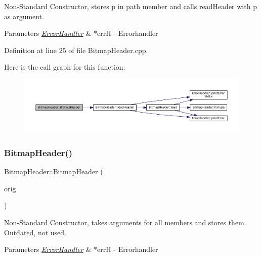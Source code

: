 Non-\/\+Standard Constructor, stores p in path member and calls read\+Header with p as argument. 


\begin{DoxyParams}{Parameters}
{\em \mbox{\hyperlink{classErrorHandler}{Error\+Handler}}} & $\ast$errH -\/ Errorhandler \\
\hline
\end{DoxyParams}


Definition at line 25 of file Bitmap\+Header.\+cpp.

Here is the call graph for this function\+:\nopagebreak
\begin{figure}[H]
\begin{center}
\leavevmode
\includegraphics[width=350pt]{classBitmapHeader_a2cf57f049eae7d2ee93d5749d678aca5_cgraph}
\end{center}
\end{figure}
\mbox{\label{classBitmapHeader_a25a5481f49d70a8c42a9efc17f17fd48}} 
\subsubsection{\texorpdfstring{BitmapHeader()}{BitmapHeader()}\hspace{0.1cm}{\footnotesize\ttfamily [3/3]}}
{\footnotesize\ttfamily Bitmap\+Header\+::\+Bitmap\+Header (\begin{DoxyParamCaption}\item[{const \mbox{\hyperlink{classBitmapHeader}{Bitmap\+Header}} \&}]{orig }\end{DoxyParamCaption})}



Non-\/\+Standard Constructor, takes arguments for all members and stores them. Outdated, not used. 


\begin{DoxyParams}{Parameters}
{\em \mbox{\hyperlink{classErrorHandler}{Error\+Handler}}} & $\ast$errH -\/ Errorhandler \\
\hline
\end{DoxyParams}


